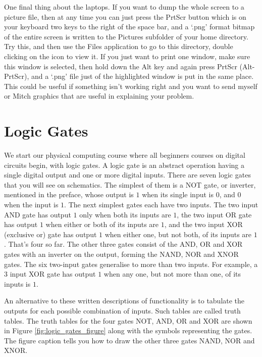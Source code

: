 \documentclass[../physical_computing.tex]{subfiles}
\begin{document}
One final thing about the laptops. If you want to dump the whole screen to a picture file, then at any time you can just press the PrtScr button which is on your keyboard two keys to the right of the space bar, and a `.png' format bitmap of the entire screen is written to the Pictures subfolder of your home directory. Try this, and then use the Files application to go to this directory, double clicking on the icon to view it. If you just want to print one window, make sure this window is selected, then hold down the Alt key and again press PrtScr (Alt-PrtScr), and a `.png' file just of the highlighted window is put in the same place. This could be useful if something isn't working right and you want to send myself or Mitch graphics that are useful in explaining your problem.

\section{Logic Gates}
\label{sec:logicgates}

We start our physical computing course where all beginners courses on digital circuits begin, with logic gates.
A logic gate is an abstract operation having a single digital output and one or more digital inputs. There are seven
logic gates that you will see on schematics. The simplest of them is a NOT gate, or inverter, mentioned in the preface,
whose output is $1$ when its single input is $0$, and $0$ when the input is $1$. The next simplest gates each have two inputs. The two input AND gate has output $1$ only when both its inputs are $1$, the two input OR gate has output $1$ when either or both of its inputs are $1$, and the two input XOR (exclusive or) gate has output $1$ when either one, but not both, of its inputs are $1$. That's four so far. The other three gates consist of the AND, OR and XOR gates with an inverter on the output, forming the NAND, NOR and XNOR gates. The six two-input gates generalise to more than two inputs. For example, a 3 input XOR gate has output $1$ when any one, but not more than one, of its inputs is $1$.

An alternative to these written descriptions of functionality is to tabulate the outputs for each possible combination of inputs. Such tables are called truth tables. The truth tables for the four gates NOT, AND, OR and XOR are shown in Figure \ref{fig:logic_gates_figure}
along with the symbols representing the gates. The figure caption tells you how to draw the other three gates NAND, NOR and XNOR. 
\end{document}
